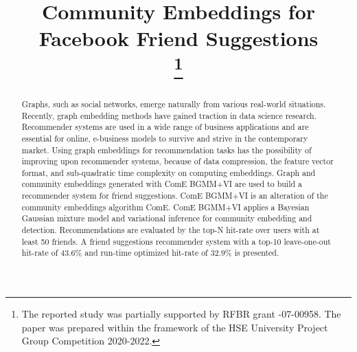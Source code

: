 \documentclass[conference]{IEEEtran}
\begin{document}
\title{Community Embeddings for Facebook Friend Suggestions\\
    \thanks{The reported study was partially supported by RFBR grant -07-00958. The paper was prepared within the framework of the HSE University Project Group Competition 2020-2022.}
}

\author{
    \and
}

\maketitle

\begin{abstract}
    Graphs, such as social networks, emerge naturally from various real-world situations. Recently, graph embedding methods have gained traction in data science research.
    Recommender systems are used in a wide range of business applications and are essential for online, e-business models to survive and strive in the contemporary market. Using graph embeddings for recommendation tasks has the possibility of improving upon recommender systems, because of data compression, the feature vector format, and sub-quadratic time complexity on computing embeddings.
    Graph and community embeddings generated with ComE BGMM+VI are used to build a recommender system for friend suggestions. ComE BGMM+VI is an alteration of the community embeddings algorithm ComE. ComE BGMM+VI applies a Bayesian Gaussian mixture model and variational inference for community embedding and detection.
    Recommendations are evaluated by the top-N hit-rate over users with at least 50 friends. A friend suggestions recommender system with a top-10 leave-one-out hit-rate of 43.6\% and run-time optimized hit-rate of 32.9\% is presented.
\end{abstract}
\end{document}
